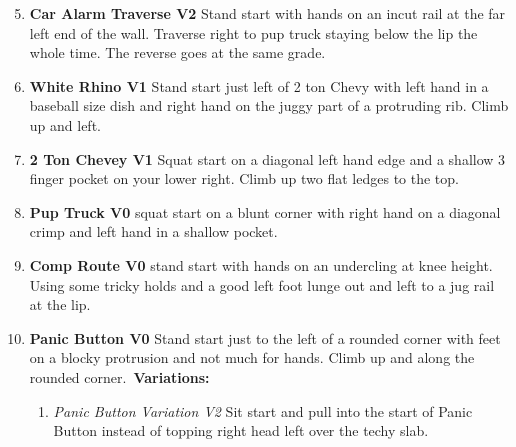 \begin{enumerate}[]
	\setcounter{enumi}{4}
	\item\label{rt:Car Alarm Traverse} \colorbox{green!20}{\textbf{Car Alarm Traverse V2    } }
	\newline Stand start with hands on an incut rail at the far left end of the wall. Traverse right to pup truck staying below the lip the whole time. The reverse goes at the same grade.\
	\setcounter{enumi}{5}
	\item\label{rt:White Rhino} \colorbox{green!20}{\textbf{White Rhino V1   } }
	\newline Stand start just left of 2 ton Chevy with left hand in a baseball size dish and right hand on the juggy part of a protruding rib. Climb up and left.\
	\setcounter{enumi}{6}
	\item\label{rt:2 Ton Chevey} \colorbox{green!20}{\textbf{2 Ton Chevey V1    } }
	\newline Squat start on a diagonal left hand edge and a shallow 3 finger pocket on your lower right. Climb up two flat ledges to the top.\
	\setcounter{enumi}{7}
	\item\label{rt:Pup Truck} \colorbox{green!20}{\textbf{Pup Truck V0  \ding{72}  } }
	\newline squat start on a blunt corner with right hand on a diagonal crimp and left hand in a shallow pocket.\
	\setcounter{enumi}{8}
	\item\label{rt:Comp Route} \colorbox{green!20}{\textbf{Comp Route V0 \ding{72}  } }
	\newline stand start with hands on an undercling at knee height. Using some tricky holds and a good left foot lunge out and left to a jug rail at the lip.\
	\setcounter{enumi}{9}
	\item\label{rt:Panic Button} \colorbox{green!20}{\textbf{Panic Button V0 \ding{72}  } }
	\newline Stand start just to the left of a rounded corner with feet on a blocky protrusion and not much for hands. Climb up and along the rounded corner.\
	\newline \textbf{Variations:}
	\begin{enumerate}
		\item\label{vr:Panic Button Variation} \colorbox{green!20}{\emph{Panic Button Variation V2 \ding{72} \ding{72}  }  }
		\newline Sit start and pull into the start of Panic Button instead of topping right head left over the techy slab.\
	\end{enumerate}
\end{enumerate}
